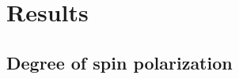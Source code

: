 \documentclass{beamer}
\begin{document}









\section{Results}



\subsection{Degree of spin polarization}
\end{document}
